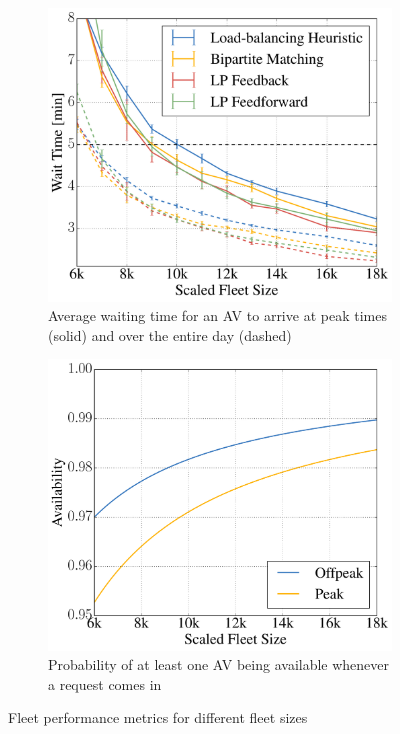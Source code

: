 \begin{figure}
    \centering
    \begin{subfigure}[t]{0.495\textwidth}
        \includegraphics[width=1.0\textwidth]{figures/mean_peak_waiting_times.pdf}
        \caption{Average waiting time for an AV to arrive at peak times (solid) and over the entire day (dashed)}
        \label{fig:mean_peak_waiting_times}
    \end{subfigure}\hfill
    \begin{subfigure}[t]{0.495\textwidth}
        \includegraphics[width=1.0\textwidth]{figures/availability.pdf}
        \caption{Probability of at least one AV being available whenever a request comes in}
        \label{fig:performanceavailability}
    \end{subfigure}
    \caption{Fleet performance metrics for different fleet sizes}
\end{figure}

